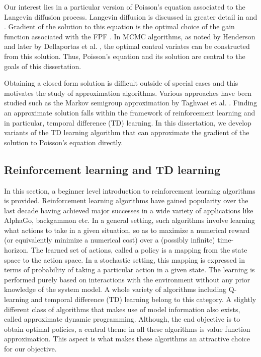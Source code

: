 Our interest lies in a particular version of Poisson's equation associated to the Langevin diffusion process. Langevin diffusion is discussed in greater detail in  and . Gradient of the solution to this equation is the optimal choice of the gain function associated with the FPF \cite{yanmehmey13}. In MCMC algorithms, as noted by Henderson \cite{henthesis97} and later by Dellaportas et al. \cite{delkon12}, the optimal control variates can be constructed from this solution. Thus, Poisson's equation and its solution are central to the goals of this dissertation. 

Obtaining a closed form solution is difficult outside of special cases and this motivates the study of approximation algorithms. Various approaches have been studied such as the Markov semigroup approximation by Taghvaei et al. \cite{tagmeh16a}. Finding an approximate solution falls within the framework of reinforcement learning and in particular, temporal difference (TD) learning. In this dissertation, we develop variants of the TD learning algorithm that can approximate the gradient of the solution to Poisson's equation directly.



\subsection{Reinforcement learning and TD learning}
\label{rl_td}
In this section, a beginner level introduction to reinforcement learning algorithms is provided. Reinforcement learning algorithms have gained popularity over the last decade having achieved major successes in a wide variety of applications like AlphaGo, backgammon etc.  In a general setting, such algorithms involve learning what actions to take in a given situation, so as to maximize a numerical reward (or equivalently minimize a numerical cost) over a (possibly infinite) time-horizon. The learned set of actions, called a policy is a mapping from the state space to the action space. In a stochastic setting, this mapping is expressed in terms of probability of taking a particular action in a given state. The learning is performed purely based on interactions with the environment without any prior knowledge of the system model. A whole variety of algorithms including Q-learning \cite{watday92a} and temporal difference (TD) learning \cite{sut88} belong to this category. A slightly different class of algorithms that makes use of model information also exists, called approximate dynamic programming. 
Although, the end objective is to obtain optimal policies, a central theme in all these algorithms is value function approximation. This aspect is what makes these algorithms an attractive choice for our objective. 

